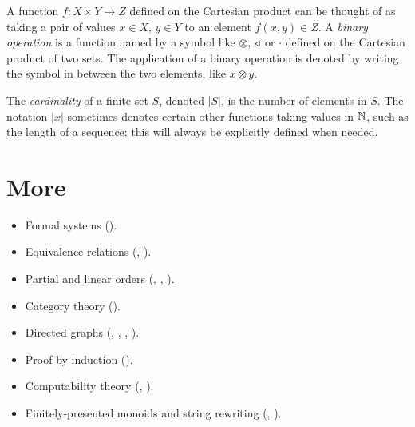 \documentclass[../generics]{subfiles}
\begin{document}
A function $f\colon X\times Y\rightarrow Z$ defined on the Cartesian product can be thought of as taking a pair of values $x\in X$, $y\in Y$ to an element $f(x,y)\in Z$. A \emph{binary operation} is a function named by a symbol like $\otimes$, $\triangleleft$ or $\cdot$ defined on the Cartesian product of two sets. The application of a binary operation is denoted by writing the symbol in between the two elements, like $x\otimes y$.

The \emph{cardinality} of a finite set $S$, denoted $|S|$, is the number of elements in $S$. The notation $|x|$ sometimes denotes certain other functions taking values in $\mathbb{N}$, such as the length of a sequence; this will always be explicitly defined when needed.

\section*{More}

\begin{itemize}
\item Formal systems ().
\item Equivalence relations (, ).
\item Partial and linear orders (, , ).
\item Category theory ().
\item Directed graphs (, , , ).
\item Proof by induction ().
\item Computability theory (, ).
\item Finitely-presented monoids and string rewriting (, ).
\end{itemize}
\end{document}
